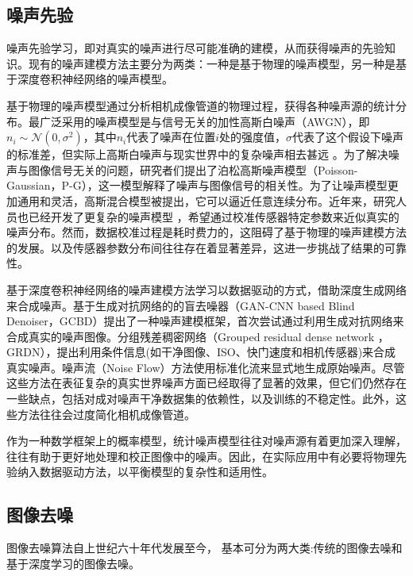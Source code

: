 \subsection{噪声先验}

噪声先验学习，即对真实的噪声进行尽可能准确的建模，从而获得噪声的先验知识。现有的噪声建模方法主要分为两类：一种是基于物理的噪声模型，另一种是基于深度卷积神经网络的噪声模型。

基于物理的噪声模型通过分析相机成像管道的物理过程，获得各种噪声源的统计分布。最广泛采用的噪声模型是与信号无关的加性高斯白噪声（AWGN），即$n_i \sim \mathcal{N}\left(0,\sigma^2\right)$，其中$n_i$代表了噪声在位置$i$处的强度值，$\sigma$代表了这个假设下噪声的标准差，但实际上高斯白噪声与现实世界中的复杂噪声相去甚远 \cite{nlm}。为了解决噪声与图像信号无关的问题，研究者们提出了泊松高斯噪声模型（Poisson-Gaussian，P-G）\cite{foi2008noise, foi2009noise}，这一模型解释了噪声与图像信号的相关性。为了让噪声模型更加通用和灵活，高斯混合模型\cite{noisemodeling2denoising}被提出，它可以逼近任意连续分布。近年来，研究人员也已经开发了更复杂的噪声模型 \cite{eld, rethinking, awgn}，希望通过校准传感器特定参数来近似真实的噪声分布。然而，数据校准过程是耗时费力的，这阻碍了基于物理的噪声建模方法的发展。以及传感器参数分布间往往存在着显著差异，这进一步挑战了结果的可靠性。

基于深度卷积神经网络的噪声建模方法学习以数据驱动的方式，借助深度生成网络来合成噪声\cite{noiseflow, learningcamera, c2n, gcbd, dan}。基于生成对抗网络的的盲去噪器（GAN-CNN based Blind Denoiser，GCBD）提出了一种噪声建模框架，首次尝试通过利用生成对抗网络来合成真实的噪声图像。分组残差稠密网络（Grouped residual dense network ，GRDN）\cite{grdn}，提出利用条件信息(如干净图像、ISO、快门速度和相机传感器)来合成真实噪声。噪声流（Noise Flow）\cite{noiseflow}方法使用标准化流来显式地生成原始噪声。尽管这些方法在表征复杂的真实世界噪声方面已经取得了显著的效果，但它们仍然存在一些缺点，包括对成对噪声干净数据集的依赖性，以及训练的不稳定性\cite{srgbflow}。此外，这些方法往往会过度简化相机成像管道\cite{co}。

作为一种数学框架上的概率模型，统计噪声模型往往对噪声源有着更加深入理解，往往有助于更好地处理和校正图像中的噪声。因此，在实际应用中有必要将物理先验纳入数据驱动方法，以平衡模型的复杂性和适用性。

\subsection{图像去噪}

图像去噪算法自上世纪六十年代发展至今， 基本可分为两大类:传统的图像去噪和基于深度学习的图像去噪。

